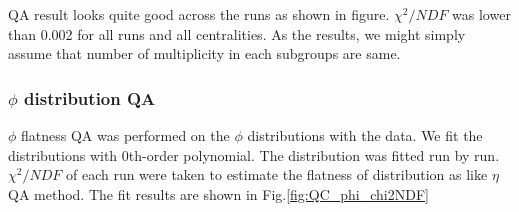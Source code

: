 QA result looks quite good across the runs as shown in figure. $\chi^2/NDF$ was lower than 0.002 for all runs and all centralities. As the results, we might simply assume that number of multiplicity in each subgroups are same.



\subsubsection{ $\phi$ distribution QA}

 $\phi$ flatness QA was performed on the $\phi$ distributions with the data. We fit the distributions with 0th-order polynomial. The distribution was fitted run by run. $\chi^2/NDF$ of each run were taken to estimate the flatness of distribution as like $\eta$ QA method. The fit results are shown in Fig.\ref{fig:QC_phi_chi2NDF}
 
